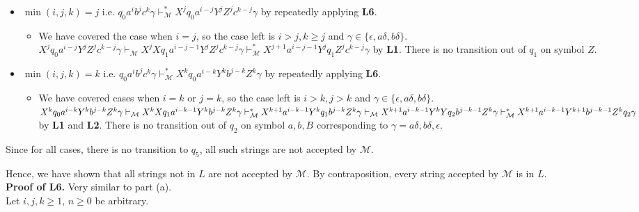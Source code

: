 \documentclass[12pt]{article}
\begin{document}
\begin{itemize}
\begin{itemize}
\begin{itemize}
      \(X^iq_0Y^iZ^i\gamma \vdash^*_\mathcal{M} X^iY^iZ^iq_4\gamma\) by \textbf{L4}. No transition out of \(q_4\) on symbol \(a\) or \(b\).
    \end{itemize}
    \item \(\min(i, j, k) = j\) i.e. \(q_0a^ib^jc^k\gamma \vdash^*_\mathcal{M} X^jq_0a^{i-j}Y^jZ^jc^{k-j}\gamma\) by repeatedly applying \textbf{L6}.
    \begin{itemize}
      \item We have covered the case when \(i =j\), so the case left is \(i > j, k \geq j\) and \(\gamma \in \{\epsilon, a\delta, b\delta\}\).\\ \(X^jq_0a^{i-j}Y^jZ^jc^{k-j}\gamma \vdash_\mathcal{M} X^jXq_1a^{i-j-1}Y^jZ^jc^{k-j}\gamma \vdash^*_\mathcal{M} X^{j+1}a^{i-j-1}Y^jq_1Z^jc^{k-j}\gamma\) by \textbf{L1}. There is no transition out of \(q_1\) on symbol \(Z\).
    \end{itemize}
    \item \(\min(i, j, k) = k\) i.e. \(q_0a^ib^jc^k\gamma \vdash^*_\mathcal{M} X^kq_0a^{i-k}Y^kb^{j-k}Z^k\gamma\) by repeatedly applying \textbf{L6}.
    \begin{itemize}
      \item We have covered cases when \(i = k\) or \(j = k\), so the case left is \(i > k, j > k\) and \(\gamma \in \{\epsilon, a\delta, b\delta\}\).\\
      \(X^kq_0a^{i-k}Y^kb^{j-k}Z^k\gamma \vdash_\mathcal{M} X^kXq_1a^{i-k-1}Y^kb^{j-k}Z^k\gamma \vdash^*_\mathcal{M} X^{k+1}a^{i-k-1}Y^kq_1b^{j-k}Z^k\gamma \\ \vdash_\mathcal{M} X^{k+1}a^{i-k-1}Y^kYq_2b^{j-k-1}Z^k\gamma \vdash^*_\mathcal{M} X^{k+1}a^{i-k-1}Y^{k+1}b^{j-k-1}Z^kq_2\gamma\) by \textbf{L1} and \textbf{L2}. There is no transition out of \(q_2\) on symbol \(a, b, B\) corresponding to \(\gamma = a\delta, b\delta, \epsilon\).
    \end{itemize}
  \end{itemize}
  Since for all cases, there is no transition to \(q_5\), all such strings are not accepted by \(\mathcal{M}\).
\end{itemize}
Hence, we have shown that all strings not in \(L\) are not accepted by \(\mathcal{M}\). By contraposition, every string accepted by \(\mathcal{M}\) is in \(L\).\\
\noindent
\textbf{Proof of L6.} Very similar to part (a).\\
   Let \(i, j, k \geq 1\), \(n \geq 0\) be arbitrary.
\end{document}
